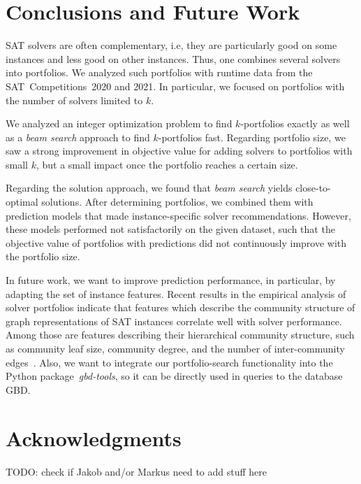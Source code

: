 \documentclass[conference]{IEEEtran}
\newcommand{\todo}[1]{{\color{red}TODO: #1}}
\begin{document}
\section{Conclusions and Future Work}
\label{sec:conclusion}

SAT solvers are often complementary, i.e, they are particularly good on some instances and less good on other instances.
Thus, one combines several solvers into portfolios.
We analyzed such portfolios with runtime data from the SAT~Competitions~2020 and 2021.
In particular, we focused on portfolios with the number of solvers limited to $k$.

We analyzed an integer optimization problem to find $k$-portfolios exactly as well as a \emph{beam search} approach to find $k$-portfolios fast.
Regarding portfolio size, we saw a strong improvement in objective value for adding solvers to portfolios with small $k$, but a small impact once the portfolio reaches a certain size.

Regarding the solution approach, we found that \emph{beam search} yields close-to-optimal solutions.
After determining portfolios, we combined them with prediction models that made instance-specific solver recommendations.
However, these models performed not satisfactorily on the given dataset, such that the objective value of portfolios with predictions did not continuously improve with the portfolio size.

In future work, we want to improve prediction performance, in particular, by adapting the set of instance features.
Recent results in the empirical analysis of solver portfolios indicate that features which describe the community structure of graph representations of SAT instances correlate well with solver performance. 
Among those are features describing their hierarchical community structure, such as community leaf size, community degree, and the number of inter-community edges~\cite{Li:2021:HCS}. 
Also, we want to integrate our portfolio-search functionality into the Python package~\emph{gbd-tools}, so it can be directly used in queries to the database GBD.

\section*{Acknowledgments}

\todo{check if Jakob and/or Markus need to add stuff here}

\balance %



\end{document}
